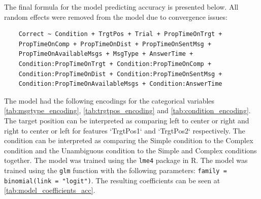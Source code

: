 The final formula for the model predicting accuracy is presented below. All random effects were removed from the model due to convergence issues:
\begin{verbatim}
    Correct ~ Condition + TrgtPos + Trial + PropTimeOnTrgt +
    PropTimeOnComp + PropTimeOnDist + PropTimeOnSentMsg + 
    PropTimeOnAvailableMsgs + MsgType + AnswerTime + 
    Condition:PropTimeOnTrgt + Condition:PropTimeOnComp +
    Condition:PropTimeOnDist + Condition:PropTimeOnSentMsg +
    Condition:PropTimeOnAvailableMsgs + Condition:AnswerTime
\end{verbatim}
The model had the following encodings for the categorical variables \autoref{tab:msgtype_encoding}, \autoref{tab:trgtpos_encoding} and \autoref{tab:condition_encoding}. The target position can be interpreted as comparing left to center or right and right to center or left for features `TrgtPos1` and `TrgtPos2` respectively. The condition can be interpreted as comparing the Simple condition to the Complex condition and the Unambiguous condition to the Simple and Complex conditions together. The model was trained using the \texttt{lme4} package in R. The model was trained using the \texttt{glm} function with the following parameters: \texttt{family = binomial(link = "logit")}. The resulting coefficients can be seen at \autoref{tab:model_coefficients_acc}. 

